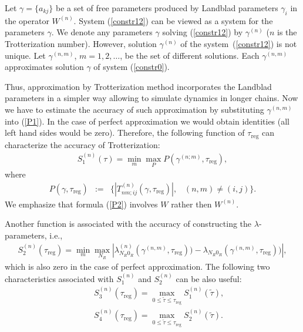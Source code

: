 \documentclass[pra,preprint,showpacs]{revtex4-1}
\begin{document}
{Let $\gamma= \{a_{kj}\}$ be a set of free parameters produced by Landblad parameters $\gamma_i$  in the operator $W^{(n)}$. System (\ref{constr12}) can be viewed as a system for the parameters $\gamma$. We denote any parameters $\gamma$  solving  (\ref{constr12}) by $\gamma^{(n)}$ ($n$ is the Trotterization number).
However,  solution $\gamma^{(n)}$ of the system~(\ref{constr12}) is not unique.
Let $\gamma^{(n,m)}$, $m=1,2,\dots$,  be the set of different solutions.
Each  $\gamma^{(n,m)}$ approximates solution $\gamma$ of system
(\ref{constr0}).

Thus, approximation by Trotterization method incorporates the Landblad parameters in a simpler way allowing to simulate dynamics in longer chains. Now we have to estimate the accuracy of such approximation by substituting $\gamma^{(n,m)}$ into (\ref{P1}). In the case of perfect approximation we would obtain identities (all left hand sides would be zero). Therefore, the following function { of $\tau_{\mathrm{reg}}$} can characterize the accuracy of Trotterization:
\begin{eqnarray}\label{epsilon}
S^{(n)}_1(\tau) =\min_m \max_P P(\gamma^{(n;m)},\tau_{\mathrm{reg}}),
\end{eqnarray}
where
\begin{eqnarray}\label{P2}
 P(\gamma,\tau_{\mathrm{reg}})&:=&\Big\{|T^{(n)}_{nm;ij}(\gamma,\tau_{\mathrm{reg}})|, \;\;\;(n,m)\neq (i,j)\Big\}.
\end{eqnarray}
We emphasize that formula (\ref{P2}) involves $W$ rather then $W^{(n)}$.

Another function is associated with the accuracy of constructing the $\lambda$-parameters, i.e.,
\begin{eqnarray}\label{epsilon2}
S^{(n)}_2(\tau_{\mathrm{reg}}) =\min_m\max_{N_R} \left|\lambda^{(n)}_{N_R0_R}(\gamma^{(n,m)},\tau_{\mathrm{reg}})) -
\lambda_{N_R0_R}(\gamma^{(n,m)},\tau_{\mathrm{reg}}))\right|,
\end{eqnarray}
which is also zero in the case of perfect approximation.
The following two characteristics associated with $S_1^{(n)}$ and $S_2^{(n)}$ can be also useful:
\begin{eqnarray}\label{S3}
&&
S^{(n)}_3(\tau_{\mathrm{reg}}) = \max_{0\le\tilde \tau\le \tau_{\mathrm{reg}}} S^{(n)}_1(\tilde \tau),
\\\label{S4}
&&
S^{(n)}_4(\tau_{\mathrm{reg}}) = \max_{0\le\tilde \tau\le \tau_{\mathrm{reg}}} S^{(n)}_2(\tilde \tau).
\end{eqnarray}

}
\end{document}
